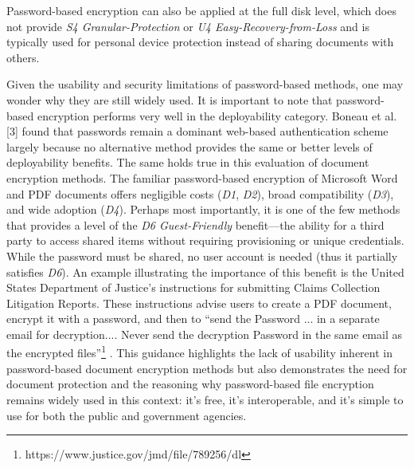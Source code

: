 \documentclass[sigconf]{acmart}
\begin{document}
Password-based encryption can also be applied at the full disk level, which does not provide \textit{S4 Granular-Protection} or \textit{U4 Easy-Recovery-from-Loss} and is typically used for personal device protection instead of sharing documents with others.

Given the usability and security limitations of password-based methods, one may wonder why they are still widely used. It is important to note that password-based encryption performs very well in the deployability category. Boneau et al. [3] found that passwords remain a dominant web-based authentication scheme largely because no alternative method provides the same or better levels of deployability benefits. The same holds true in this evaluation of document encryption methods. The familiar password-based encryption of Microsoft Word and PDF documents offers negligible costs (\textit{D1}, \textit{D2}), broad compatibility (\textit{D3}), and wide adoption (\textit{D4}). Perhaps most importantly, it is one of the few methods that provides a level of the \textit{D6 Guest-Friendly} benefit—the ability for a third party to access shared items without requiring provisioning or unique credentials. While the password must be shared, no user account is needed (thus it partially satisfies \textit{D6}). An example illustrating the importance of this benefit is the United States Department of Justice’s instructions for submitting Claims Collection Litigation Reports. These instructions advise users to create a PDF document, encrypt it with a password, and then to “send the Password ... in a separate email for decryption.... Never send the decryption Password in the same email as the encrypted files”\footnote{https://www.justice.gov/jmd/file/789256/dl} . This guidance highlights the lack of usability inherent in password-based document encryption methods but also demonstrates the need for document protection and the reasoning why password-based file encryption remains
widely used in this context: it’s free, it’s interoperable, and it’s simple to use for both the public and government agencies.
\end{document}

